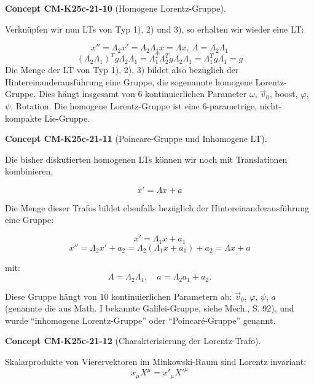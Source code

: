 \documentclass[10pt, letterpaper]{article}
\newcommand{\CustomHeading}[3]{%
  \par\medskip\noindent%
  \textbf{#1 #2} \textnormal{(#3)}.\enskip%
}
\newenvironment{CONC}[2]{\CustomHeading{Concept}{#1}{#2}}{}
\begin{document}
\begin{CONC}{CM-K25c-21-10}{Homogene Lorentz-Gruppe}
Verknüpfen wir nun LTs von Typ 1), 2) und 3), so erhalten wir wieder eine LT:

$$x'' = \Lambda_2 x' = \Lambda_2 \Lambda_1 x = \Lambda x,\ \Lambda = \Lambda_2 \Lambda_1$$
$$(\Lambda_2 \Lambda_1)^T g \Lambda_2 \Lambda_1 = \Lambda_1^T \Lambda_2^T g \Lambda_2 \Lambda_1 = \Lambda_1^T g \Lambda_1 = g$$
Die Menge der LT von Typ 1), 2), 3) bildet also bezüglich der Hintereinanderausführung eine Gruppe, die sogenannte homogene Lorentz-Gruppe. Dies hängt insgesamt von
6 kontinuierlichen Parameter $\omega$, $\vec{v}_0$, boost, $\varphi$, $\psi$, Rotation.
Die homogene Lorentz-Gruppe ist eine 6-parametrige, nicht-kompakte Lie-Gruppe.
\end{CONC}

\begin{CONC}{CM-K25c-21-11}{Poincare-Gruppe und Inhomogene LT}
Die bisher diskutierten homogenen LTs können wir noch mit Translationen kombinieren,

\[x' = \Lambda x + a\]

Die Menge dieser Trafos bildet ebenfalls bezüglich der Hintereinanderausführung eine Gruppe:

\[x' = \Lambda_1 x + a_1\]
\[x'' = \Lambda_2 x' + a_2 = \Lambda_2(\Lambda_1 x + a_1) + a_2 = \Lambda x + a\]

mit: \[\Lambda = \Lambda_2\Lambda_1, \quad a = \Lambda_2 a_1 + a_2.\]

Diese Gruppe hängt von 10 kontinuierlichen Parametern ab: $\vec{v}_0$, $\varphi$, $\psi$, $a$ (genannte die aus Math. I bekannte Galilei-Gruppe, siehe Mech., S. 92), und wurde ``inhomogene Lorentz-Gruppe'' oder ``Poincaré-Gruppe'' genannt.
\end{CONC}

\begin{CONC}{CM-K25c-21-12}{Charakterisierung der Lorentz-Trafo}
Skalarprodukte von Vierervektoren im Minkowski-Raum sind Lorentz invariant: 
$$x_\mu X^\mu = x'_\mu X'^\mu$$
\end{CONC}
\end{document}
